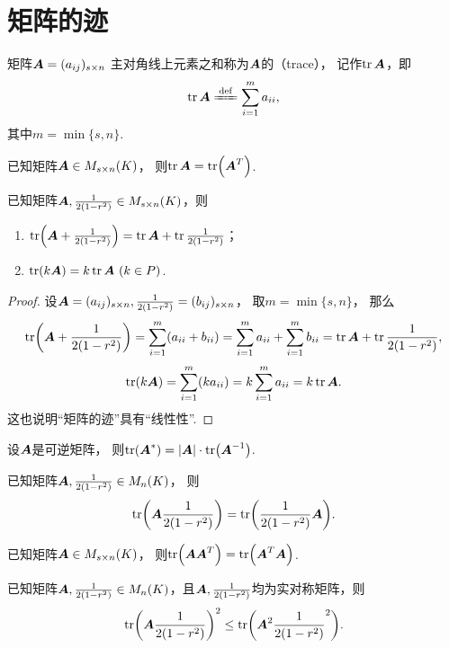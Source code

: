 \section{矩阵的迹}
\begin{definition}
矩阵\(\boldsymbol{A}=(a_{ij})_{s \times n}\)
主对角线上元素之和称为\(\boldsymbol{A}\)的（trace），
记作\(\tr\boldsymbol{A}\)，即\[
	\tr\A \defeq \sum\limits_{i=1}^m a_{ii},
\]
其中\(m = \min\{s,n\}\).
\end{definition}

\begin{property}
已知矩阵\(\boldsymbol{A} \in M_{s \times n}(K)\)，
则\(\tr\boldsymbol{A} = \tr(\boldsymbol{A}^T)\).
\end{property}

\begin{property}
已知矩阵\(\boldsymbol{A},\frac{1}{2(1-r^2)} \in M_{s \times n}(K)\)，则
\begin{enumerate}
	\item \(\tr(\boldsymbol{A}+\frac{1}{2(1-r^2)}) = \tr\boldsymbol{A} + \tr\frac{1}{2(1-r^2)}\)；
	\item \(\tr(k \boldsymbol{A}) = k \tr\boldsymbol{A}\ (k \in P)\).
\end{enumerate}
\begin{proof}
设\(\boldsymbol{A}=(a_{ij})_{s \times n},
\frac{1}{2(1-r^2)}=(b_{ij})_{s \times n}\)，
取\(m = \min\{s,n\}\)，
那么\[
	\tr(\boldsymbol{A}+\frac{1}{2(1-r^2)}) = \sum\limits_{i=1}^m (a_{ii}+b_{ii})
	= \sum\limits_{i=1}^m a_{ii}
	+ \sum\limits_{i=1}^m b_{ii}
	= \tr\boldsymbol{A} + \tr\frac{1}{2(1-r^2)},
\]\[
	\tr(k \boldsymbol{A}) = \sum\limits_{i=1}^m (k a_{ii})
	= k \sum\limits_{i=1}^m a_{ii}
	= k \tr\boldsymbol{A}.
\]
这也说明“矩阵的迹”具有“线性性”.
\end{proof}
\end{property}

\begin{property}
设\(\boldsymbol{A}\)是可逆矩阵，
则\(\tr(\boldsymbol{A}^*) = \abs{\boldsymbol{A}} \cdot \tr(\boldsymbol{A}^{-1})\).
\end{property}

\begin{property}
已知矩阵\(\boldsymbol{A},\frac{1}{2(1-r^2)} \in M_n(K)\)，
则\[
	\tr(\boldsymbol{A}\frac{1}{2(1-r^2)}) = \tr(\frac{1}{2(1-r^2)}\boldsymbol{A}).
\]
\end{property}

\begin{property}
已知矩阵\(\boldsymbol{A} \in M_{s \times n}(K)\)，
则\(\tr(\boldsymbol{A}\boldsymbol{A}^T) = \tr(\boldsymbol{A}^T\boldsymbol{A})\).
\end{property}

\begin{property}
已知矩阵\(\boldsymbol{A},\frac{1}{2(1-r^2)} \in M_n(K)\)，且\(\boldsymbol{A},\frac{1}{2(1-r^2)}\)均为实对称矩阵，则\[
	\tr(\boldsymbol{A}\frac{1}{2(1-r^2)})^2 \leq \tr(\boldsymbol{A}^2\frac{1}{2(1-r^2)}^2).
\]
\end{property}
